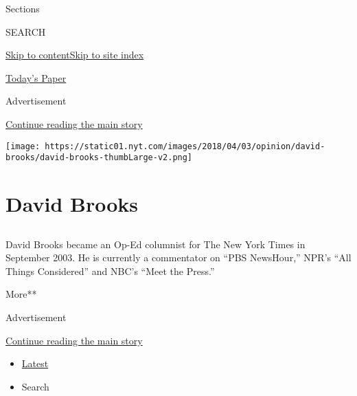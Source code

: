 Sections

SEARCH

\protect\hyperlink{site-content}{Skip to
content}\protect\hyperlink{site-index}{Skip to site index}

\href{https://myaccount.nytimes.com/auth/login?response_type=cookie\&client_id=vi}{}

\href{https://www.nytimes.com/section/todayspaper}{Today's Paper}

Advertisement

\protect\hyperlink{after-top}{Continue reading the main story}

\texttt{[image: https://static01.nyt.com/images/2018/04/03/opinion/david-brooks/david-brooks-thumbLarge-v2.png]}

\hypertarget{david-brooks}{%
\section{David Brooks}\label{david-brooks}}

\hypertarget{section}{%
\subsection{}\label{section}}

David Brooks became an Op-Ed columnist for The New York Times in
September 2003. He is currently a commentator on ``PBS NewsHour,'' NPR's
``All Things Considered'' and NBC's ``Meet the Press.''

More**

Advertisement

\protect\hyperlink{after-mid1}{Continue reading the main story}

\begin{itemize}
\tightlist
\item
  \protect\hyperlink{stream-panel}{Latest}
\item
  Search
\end{itemize}

